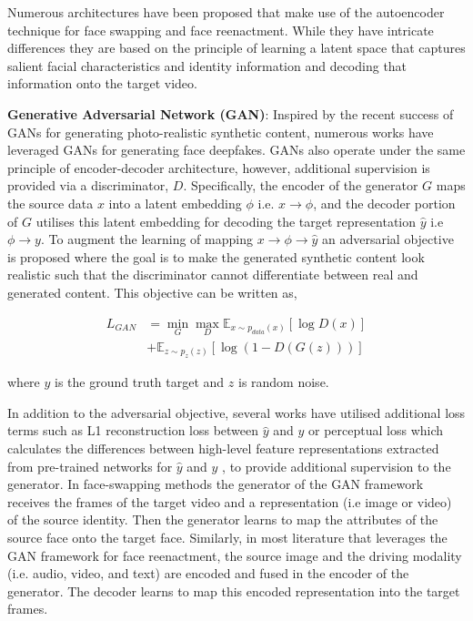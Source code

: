 Numerous architectures \cite{perov2020deepfacelab, dfaker, tewari2017mofa} have been proposed that make use of the autoencoder technique for face swapping and face reenactment. While they have intricate differences they are based on the principle of learning a latent space that captures salient facial characteristics and identity information and decoding that information onto the target video. 

\textbf{Generative Adversarial Network (GAN)}: Inspired by the recent success of GANs for generating photo-realistic synthetic content, numerous works have leveraged GANs for generating face deepfakes. GANs also operate under the same principle of encoder-decoder architecture, however, additional supervision is provided via a discriminator, $D$. Specifically, the encoder of the generator $G$ maps the source data $x$ into a latent embedding $\phi$ i.e. $x \rightarrow \phi$, and the decoder portion of $G$ utilises this latent embedding for decoding the target representation $\hat{y}$ i.e $\phi \rightarrow y$. To augment the learning of mapping $x \rightarrow \phi \rightarrow \hat{y}$ an adversarial objective is proposed where the goal is to make the generated synthetic content look realistic such that the discriminator cannot differentiate between real and generated content. This objective can be written as,

\begin{equation}
\begin{split}
L_{GAN} & = \min_G \max_D \mathbb{E}_{x \sim p_{{data}}(x)} [\log D(x)] \\
& + \mathbb{E}_{z \sim p_z(z)} [\log (1 - D(G(z)))]
\end{split}
\end{equation}

where $y$ is the ground truth target and $z$ is random noise. 

In addition to the adversarial objective, several works have utilised additional loss terms such as L1 reconstruction loss between $\hat{y}$ and $y$ \cite{wu2018reenactgan} or perceptual loss which calculates the differences between high-level feature representations extracted from pre-trained networks for $\hat{y}$ and $y$ \cite{yu2020multimodal}, to provide additional supervision to the generator. In face-swapping methods the generator of the GAN framework receives the frames of the target video and a representation (i.e image or video) of the source identity. Then the generator learns to map the attributes of the source face onto the target face. Similarly, in most literature that leverages the GAN framework for face reenactment, the source image and the driving modality (i.e. audio, video, and text) are encoded and fused in the encoder of the generator. The decoder learns to map this encoded representation into the target frames. 

